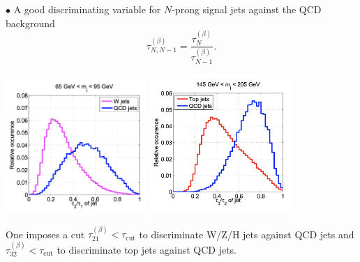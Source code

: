 \documentclass[9pt,a4paper,unknownkeysallowed,xcolor=dvipsnames,aspectratio=43]{beamer}
\begin{document}
%
%
\begin{frame}
\vspace{2mm}

{\color{darkred}\Large$\bullet$} A good discriminating variable for $N$-prong signal jets against the QCD background
\begin{equation}\label{eq:tau_ratios}
  \tau_{N,N-1}^{(\beta)} = \frac{\tau_N^{(\beta)}}{\tau_{N-1}^{(\beta)}}.
\end{equation}
\vspace{2mm}
\begin{center}
    \includegraphics[width=0.4\textwidth]{05/njettiW.png}
    \includegraphics[width=0.4\textwidth]{05/njettit.png}
\end{center}
One imposes a cut
$\tau_{21}^{(\beta)}<\tau_{\text{cut}}$ to discriminate W/Z/H jets
against QCD jets and $\tau_{32}^{(\beta)}<\tau_{\text{cut}}$ to
discriminate top jets against QCD jets.
\end{frame}
\end{document}
